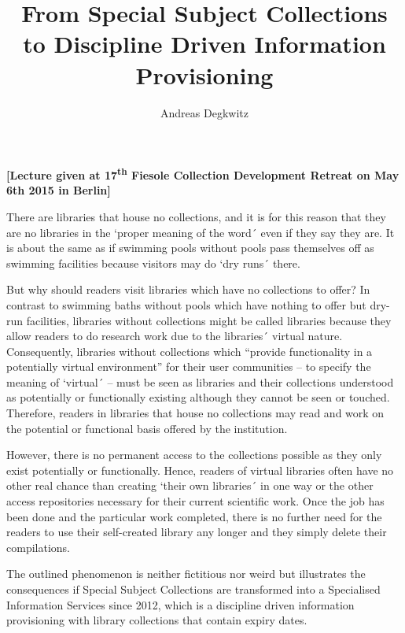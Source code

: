 \documentclass[a4paper,
fontsize=11pt,
oneside,
numbers=noperiodatend,
parskip=half-,
bibliography=totoc,
final
]{scrartcl}
\title{\LARGE{From Special Subject Collections to Discipline Driven Information Provisioning}} %
\author{Andreas Degkwitz} %
\date{}
\begin{document}
\maketitle
\thispagestyle{fancyplain} 


\textbf{{[}Lecture given at 17\textsuperscript{th} Fiesole Collection
Development Retreat on May 6th 2015 in Berlin{]}}

There are libraries that house no collections, and it is for this reason
that they are no libraries in the `proper meaning of the word´ even if
they say they are. It is about the same as if swimming pools without
pools pass themselves off as swimming facilities because visitors may do
`dry runs´ there.

But why should readers visit libraries which have no collections to
offer? In contrast to swimming baths without pools which have nothing to
offer but dry-run facilities, libraries without collections might be
called libraries because they allow readers to do research work due to
the libraries´ virtual nature. Consequently, libraries without
collections which \enquote{provide functionality in a potentially
virtual environment} for their user communities -- to specify the
meaning of `virtual´ -- must be seen as libraries and their collections
understood as potentially or functionally existing although they cannot
be seen or touched. Therefore, readers in libraries that house no
collections may read and work on the potential or functional basis
offered by the institution.

However, there is no permanent access to the collections possible as
they only exist potentially or functionally. Hence, readers of virtual
libraries often have no other real chance than creating `their own
libraries´ in one way or the other access repositories necessary for
their current scientific work. Once the job has been done and the
particular work completed, there is no further need for the readers to
use their self-created library any longer and they simply delete their
compilations.

The outlined phenomenon is neither fictitious nor weird but illustrates
the consequences if Special Subject Collections are transformed into a
Specialised Information Services since 2012, which is a discipline
driven information provisioning with library collections that contain
expiry dates.
\end{document}
